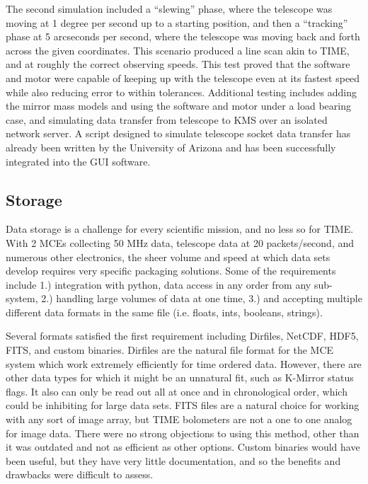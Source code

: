 \documentclass[manuscript]{aastex}
\begin{document}
The second simulation included a ``slewing'' phase, where the telescope was moving at 1 degree per second up to a starting position, and then a ``tracking'' phase at 5 arcseconds per second, where the telescope was moving back and forth across the given coordinates. This scenario produced a line scan akin to TIME, and at roughly the correct observing speeds. This test proved that the software and motor were capable of keeping up with the telescope even at its fastest speed while also reducing error to within tolerances.  Additional testing includes adding the mirror mass models and using the software and motor under a load bearing case, and simulating data transfer from telescope to KMS over an isolated network server. A script designed to simulate telescope socket data transfer has already been written by the University of Arizona and has been successfully integrated into the GUI software. 
\subsection{Storage}

Data storage is a challenge for every scientific mission, and no less so for TIME. With 2 MCEs collecting 50 MHz data, telescope data at 20 packets/second, and numerous other electronics, the sheer volume and speed at which data sets develop requires very specific packaging solutions. Some of the requirements include 1.) integration with python, data access in any order from any sub-system, 2.) handling large volumes of data at one time, 3.) and accepting multiple different data formats in the same file (i.e. floats, ints, booleans, strings). 

Several formats satisfied the first requirement including Dirfiles, NetCDF, HDF5, FITS, and custom binaries. Dirfiles are the natural file format for the MCE system which work extremely efficiently for time ordered data. However, there are other data types for which it might be an unnatural fit, such as K-Mirror status flags. It also can only be read out all at once and in chronological order, which could be inhibiting for large data sets. FITS files are a natural choice for working with any sort of image array, but TIME bolometers are not a one to one analog for image data. There were no strong objections to using this method, other than it was outdated and not as efficient as other options. Custom binaries would have been useful, but they have very little documentation, and so the benefits and drawbacks were difficult to assess. 
\end{document}
